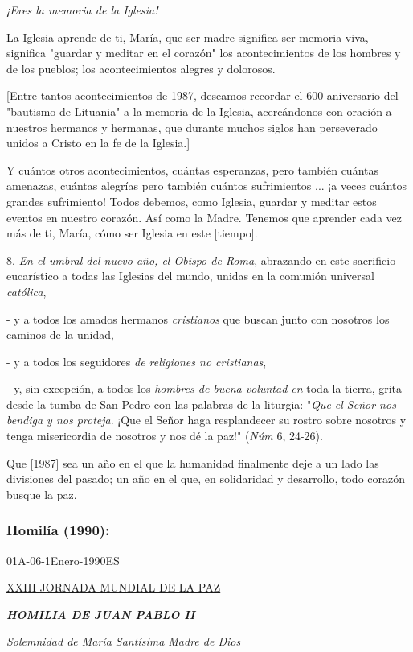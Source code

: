 \begin{body}
\emph{¡Eres la memoria de la Iglesia!}

La Iglesia aprende de ti, María, que ser madre significa ser memoria
viva, significa "guardar y meditar en el corazón" los acontecimientos de
los hombres y de los pueblos; los acontecimientos alegres y dolorosos.

{[}Entre tantos acontecimientos de 1987, deseamos recordar el 600
aniversario del "bautismo de Lituania" a la memoria de la Iglesia,
acercándonos con oración a nuestros hermanos y hermanas, que durante
muchos siglos han perseverado unidos a Cristo en la fe de la Iglesia.{]}

Y cuántos otros acontecimientos, cuántas esperanzas, pero también
cuántas amenazas, cuántas alegrías pero también cuántos sufrimientos ...
¡a veces cuántos grandes sufrimiento! Todos debemos, como Iglesia,
guardar y meditar estos eventos en nuestro corazón. Así como la Madre.
Tenemos que aprender cada vez más de ti, María, cómo ser Iglesia en este
{[}tiempo{]}.

8. \emph{En el umbral del nuevo año, el Obispo de Roma}, abrazando en
este sacrificio eucarístico a todas las Iglesias del mundo, unidas en la
comunión universal \emph{católica},

- y a todos los amados hermanos \emph{cristianos} que buscan junto con
nosotros los caminos de la unidad,

- y a todos los seguidores \emph{de religiones no cristianas},

- y, sin excepción, a todos los \emph{hombres de buena voluntad en} toda
la tierra, grita desde la tumba de San Pedro con las palabras de la
liturgia: "\emph{Que el Señor nos bendiga y nos proteja}. ¡Que el Señor
haga resplandecer su rostro sobre nosotros y tenga misericordia de
nosotros y nos dé la paz!" (\emph{Núm} 6, 24-26).

Que {[}1987{]} sea un año en el que la humanidad finalmente deje a un
lado las divisiones del pasado; un año en el que, en solidaridad y
desarrollo, todo corazón busque la paz.

\subsubsection{Homilía (1990): }
01A-06-1Enero-1990ES

\href{http://www.vatican.va/gmg/years/gmg_1990_it.html}{XXIII JORNADA
	MUNDIAL DE LA PAZ}

\emph{\textbf{HOMILIA DE JUAN PABLO II}}

\emph{Solemnidad de María Santísima Madre de Dios}


\end{body}
